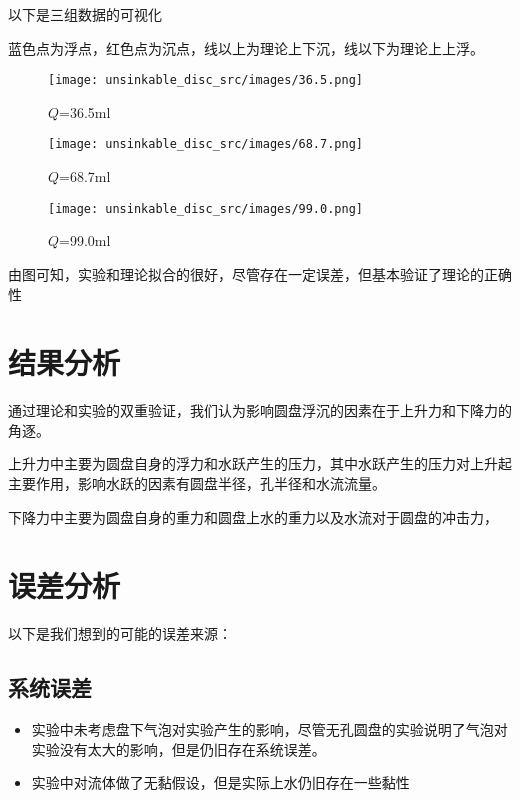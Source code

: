 \documentclass[UTF8]{gapd}
\begin{document}
以下是三组数据的可视化

蓝色点为浮点，红色点为沉点，线以上为理论上下沉，线以下为理论上上浮。
\begin{figure}[!htbp]%
  \centering
  \texttt{[image: unsinkable\_disc\_src/images/36.5.png]}
  \caption{$Q$=36.5ml}
  \label{fig:unsinkable_disc_36.5}%
\end{figure}

\begin{figure}[!htbp]%
  \centering
  \texttt{[image: unsinkable\_disc\_src/images/68.7.png]}
  \caption{$Q$=68.7ml}
  \label{fig:unsinkable_disc_68.7}%
\end{figure}

\begin{figure}[!htbp]%
  \centering
  \texttt{[image: unsinkable\_disc\_src/images/99.0.png]}
  \caption{$Q$=99.0ml}
  \label{fig:unsinkable_disc_99.0}%
\end{figure}

由图可知，实验和理论拟合的很好，尽管存在一定误差，但基本验证了理论的正确性

\section{结果分析}
通过理论和实验的双重验证，我们认为影响圆盘浮沉的因素在于上升力和下降力的角逐。

上升力中主要为圆盘自身的浮力和水跃产生的压力，其中水跃产生的压力对上升起主要作用，影响水跃的因素有圆盘半径，孔半径和水流流量。

下降力中主要为圆盘自身的重力和圆盘上水的重力以及水流对于圆盘的冲击力，

\section{误差分析}
以下是我们想到的可能的误差来源：
\subsection{系统误差}
\begin{itemize}
    \item 实验中未考虑盘下气泡对实验产生的影响，尽管无孔圆盘的实验说明了气泡对实验没有太大的影响，但是仍旧存在系统误差。
    \item 实验中对流体做了无黏假设，但是实际上水仍旧存在一些黏性
\end{itemize}
\end{document}

